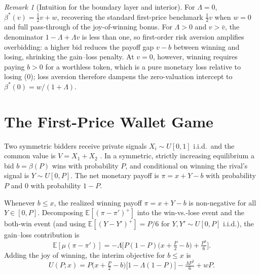 \documentclass[11pt,a4paper]{article}
\theoremstyle{remark}
\newtheorem{remark}{Remark}
\begin{document}
\begin{remark}[Intuition for the boundary layer and interior]
For $\Lambda=0$, $\beta^{*}(v)=\tfrac12 v+w$, recovering the standard first-price
benchmark $\tfrac12 v$ when $w=0$ and full pass-through of the joy-of-winning bonus.
For $\Lambda>0$ and $v>\bar v$, the denominator $1-\Lambda+\Lambda v$ is less than
one, so first-order risk aversion amplifies overbidding: a higher bid reduces the
payoff gap $v-b$ between winning and losing, shrinking the gain--loss penalty. At
$v=0$, however, winning requires paying $b>0$ for a worthless token, which is a
pure monetary loss relative to losing ($0$); loss aversion therefore dampens the
zero-valuation intercept to $\beta^*(0)=w/(1+\Lambda)$.
\end{remark}

\section{The First-Price Wallet Game}
\label{sec:wallet}
Two symmetric bidders receive private signals $X_i\sim U[0,1]$ i.i.d.\ and the
common value is $V=X_1+X_2$ \citep{klemperer1998,milgromWeber1982}. In a symmetric,
strictly increasing equilibrium a bid $b=\beta(P)$ wins with probability $P$, and
conditional on winning the rival's signal is $Y\sim U[0,P]$. The net monetary payoff
is $\pi=x+Y-b$ with probability $P$ and $0$ with probability $1-P$.

Whenever $b\le x$, the realized winning payoff $\pi=x+Y-b$ is non-negative for all
$Y\in[0,P]$. Decomposing $\mathbb{E}[(\pi-\pi')^{+}]$ into the win-vs.-lose event
and the both-win event (and using $\mathbb{E}[(Y-Y')^{+}]=P/6$ for $Y,Y'\sim U[0,P]$
i.i.d.), the gain--loss contribution is
\begin{equation}
\mathbb{E}[\mu(\pi-\pi')]=-\Lambda\Big[P(1-P)\Big(x+\tfrac{P}{2}-b\Big)+\tfrac{P^{3}}{6}\Big].
\end{equation}
Adding the joy of winning, the interim objective for $b\le x$ is
\begin{equation}
U(P;x)=P\Big(x+\tfrac{P}{2}-b\Big)\big[1-\Lambda(1-P)\big]-\tfrac{\Lambda P^{3}}{6}+wP .
\label{eq:walletobj}
\end{equation}
\end{document}
